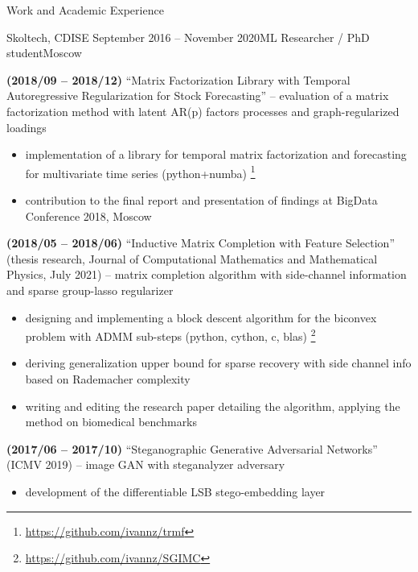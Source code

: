 \documentclass{resume} %
\begin{document}
\begin{rSection}{Work and Academic Experience}
\begin{rSubsection}{
        Skoltech, CDISE
    }{September 2016 -- November 2020}{ML Researcher / PhD student}{Moscow}
    \item \textbf{(2018/09 -- 2018/12)}
    ``Matrix Factorization Library with Temporal Autoregressive Regularization for Stock Forecasting'' -- evaluation of a matrix factorization method with latent AR(p) factors processes and graph-regularized loadings
    \begin{itemize}
        \item implementation of a library for temporal matrix factorization and forecasting for multivariate time series (python+numba)%
        \footnote{
            \url{https://github.com/ivannz/trmf}
        }

        \item contribution to the final report and presentation of findings at BigData Conference 2018, Moscow
    \end{itemize}


    \item \textbf{(2018/05 -- 2018/06)}
    ``Inductive Matrix Completion with Feature Selection'' (thesis research, Journal of Computational Mathematics and Mathematical Physics, July 2021) -- matrix completion algorithm with side-channel information and sparse group-lasso regularizer
    \begin{itemize}
        \item designing and implementing a block descent algorithm for the biconvex problem with ADMM sub-steps (python, cython, c, blas)%
        \footnote{
            \url{https://github.com/ivannz/SGIMC}
        }

        \item deriving generalization upper bound for sparse recovery with side channel info based on Rademacher complexity

        \item writing and editing the research paper detailing the algorithm, applying the method on biomedical benchmarks
    \end{itemize}

    \item \textbf{(2017/06 -- 2017/10)}
    ``Steganographic Generative Adversarial Networks'' (ICMV 2019) -- image GAN with steganalyzer adversary
    \begin{itemize}
        \item development of the differentiable LSB stego-embedding layer


\end{itemize}
\end{rSubsection}
\end{rSection}
\end{document}
